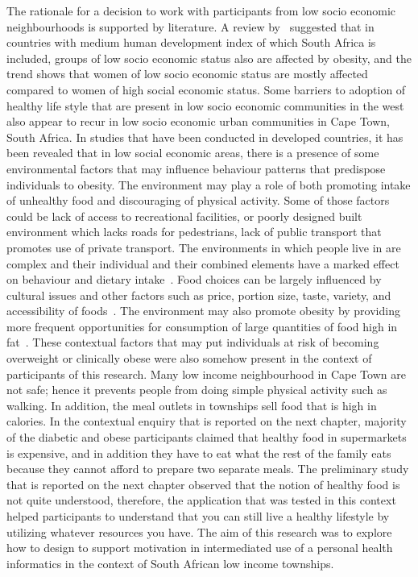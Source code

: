 The rationale for a decision to work with participants from low socio economic neighbourhoods is supported by literature. A review by~\cite{dinsa2012obesity} suggested that in countries with medium human development index of which South Africa is included, groups of low socio economic status  also are affected by obesity, and the trend shows that women of low socio economic status are mostly affected compared to women of high social economic status. Some barriers to adoption of healthy life style that are present in low socio economic communities in the west also appear to recur in low socio economic urban communities in Cape Town, South Africa. In studies that have been conducted in developed countries, it has been revealed that in low social economic areas, there is a presence of some environmental factors that may influence behaviour patterns that predispose individuals to obesity. The environment may play a role of both promoting intake of unhealthy food and discouraging of physical activity. Some of those factors could be lack of access to recreational facilities, or poorly designed built environment which lacks roads for pedestrians, lack of public transport that promotes use of private transport. The environments in which people live in are complex and their individual and their combined elements have a marked effect on behaviour and dietary intake~\citep{swinburn2004diet}. Food choices can be largely influenced by cultural issues and other factors such as price, portion size, taste, variety, and accessibility of foods~\citep{ali2009factors}. The environment may also promote obesity by providing more frequent opportunities for consumption of large quantities of food high in fat~\citep{hill1998environmental}. These contextual factors that may put individuals at risk of becoming overweight or clinically obese were also somehow present in the context of participants of this research. Many low income neighbourhood in Cape Town are not safe; hence it prevents people from doing simple physical activity such as walking. In addition, the meal outlets in townships sell food that is high in calories. In the contextual enquiry that is reported on the next chapter, majority of the diabetic and obese participants claimed that healthy food in supermarkets is expensive, and in addition they have to eat what the rest of the family eats because they cannot afford to prepare two separate meals. The preliminary study that is reported on the next chapter observed that the notion of healthy food is not quite understood, therefore, the application that was tested in this context helped participants to understand that you can still live a healthy lifestyle by utilizing whatever resources you have. The aim of this research was to explore how to design to support motivation in intermediated use of a personal health informatics in the context of South African low income townships. 

